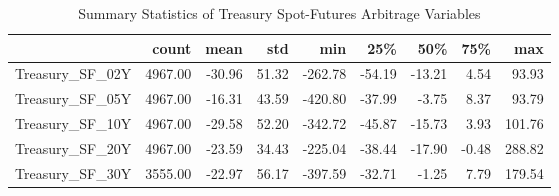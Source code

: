 \documentclass{article}
\begin{document}
\begin{table}
\caption{Summary Statistics of Treasury Spot-Futures Arbitrage Variables}
\label{tab:summary_output}
\begin{tabular}{lrrrrrrrr}
\toprule
 & count & mean & std & min & 25\% & 50\% & 75\% & max \\
\midrule
Treasury\_SF\_02Y & 4967.00 & -30.96 & 51.32 & -262.78 & -54.19 & -13.21 & 4.54 & 93.93 \\
Treasury\_SF\_05Y & 4967.00 & -16.31 & 43.59 & -420.80 & -37.99 & -3.75 & 8.37 & 93.79 \\
Treasury\_SF\_10Y & 4967.00 & -29.58 & 52.20 & -342.72 & -45.87 & -15.73 & 3.93 & 101.76 \\
Treasury\_SF\_20Y & 4967.00 & -23.59 & 34.43 & -225.04 & -38.44 & -17.90 & -0.48 & 288.82 \\
Treasury\_SF\_30Y & 3555.00 & -22.97 & 56.17 & -397.59 & -32.71 & -1.25 & 7.79 & 179.54 \\
\bottomrule
\end{tabular}
\end{table}
\end{document}
